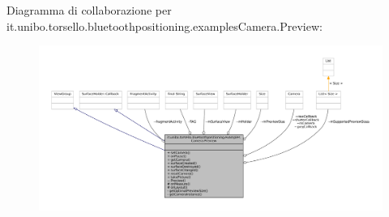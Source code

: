 Diagramma di collaborazione per it.\+unibo.\+torsello.\+bluetoothpositioning.\+examples\+Camera.\+Preview\+:
\nopagebreak
\begin{figure}[H]
\begin{center}
\leavevmode
\includegraphics[width=350pt]{classit_1_1unibo_1_1torsello_1_1bluetoothpositioning_1_1examplesCamera_1_1Preview__coll__graph}
\end{center}
\end{figure}
